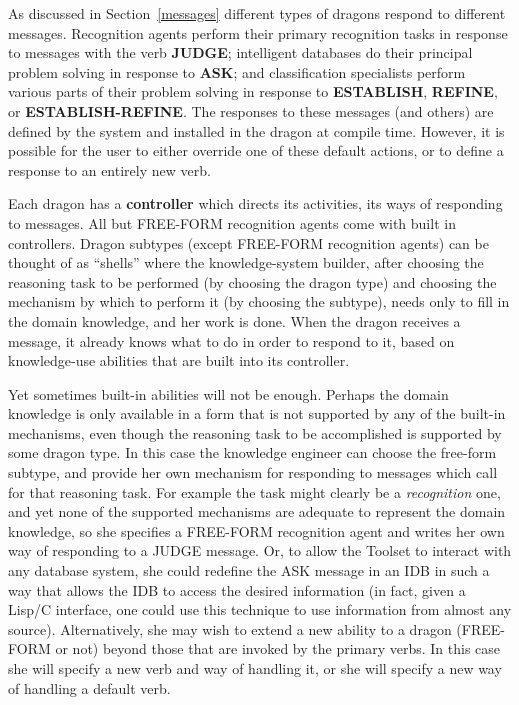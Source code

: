 As discussed in Section~\ref{messages} different types of dragons respond to
different messages.  Recognition agents perform their primary
recognition tasks in response to messages with the verb {\bf JUDGE};
intelligent databases do their principal problem solving in response
to {\bf ASK}; and classification specialists perform various parts of
their problem solving in response to {\bf ESTABLISH}, {\bf REFINE}, or
{\bf ESTABLISH-REFINE}. The responses to these messages (and others)
are defined by the system and installed in the dragon at compile time.
However, it is possible for the user to either override one of these
default actions, or to define a response to an entirely new verb.

Each dragon has a {\bf controller} which directs its activities, its
ways of responding to messages. All but FREE-FORM recognition agents
come with built in controllers.  Dragon subtypes (except FREE-FORM
recognition agents) can be thought of as ``shells'' where the
knowledge-system builder, after choosing the reasoning task to be
performed (by choosing the dragon type) and choosing the mechanism by
which to perform it (by choosing the subtype), needs only to fill in
the domain knowledge, and her work is done.  When the dragon receives
a message, it already knows what to do in order to respond to it,
based on knowledge-use abilities that are built into its controller.

Yet sometimes built-in abilities will not be enough.  Perhaps the
domain knowledge is only available in a form that is not supported by
any of the built-in mechanisms, even though the reasoning task to be
accomplished is supported by some dragon type.  In this case the
knowledge engineer can choose the free-form subtype, and provide
her own mechanism for responding to messages which call for that
reasoning task.  For example the task might clearly be a {\em
recognition\/} one, and yet none of the supported mechanisms are
adequate to represent the domain knowledge, so she specifies a
FREE-FORM recognition agent and writes her own way of responding to a
JUDGE message. Or, to allow the Toolset to interact with any database
system, she could redefine the ASK message in an IDB in such a way that
allows the IDB to access the desired information (in fact, given a
Lisp/C interface, one could use this technique to use information from
almost any source). Alternatively, she may wish to extend a new ability to
a dragon (FREE-FORM or not) beyond those that are invoked by the
primary verbs.  In this case she will specify a new verb and way of
handling it, or she will specify a new way of handling a default verb.

